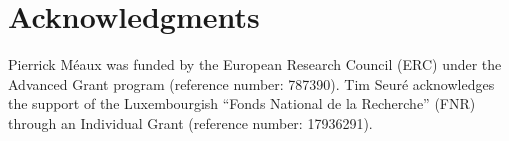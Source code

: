 \documentclass{llncs}
\begin{document}
\ifnum{}
	\section{Acknowledgments}
	Pierrick Méaux was funded by the European Research Council (\textsf{ERC}) under the Advanced Grant program (reference number: 787390). Tim Seuré acknowledges the support of the Luxembourgish “Fonds National de la Recherche” (\textsf{FNR}) through an Individual Grant (reference number: 17936291).
\fi

\newpage

\ifnum{}
	
	
\else
	
	
\fi
\end{document}
